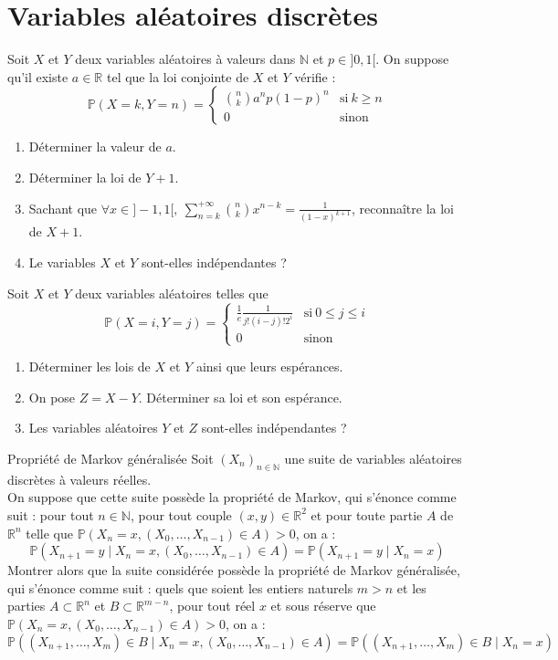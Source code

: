 \documentclass[french,a4paper]{article}
\renewcommand{\P}{\mathbb{P}}
\newcommand{\N}{\mathbb{N}}
\newcommand{\R}{\mathbb{R}}
\theoremstyle{plain}
\theoremstyle{definition}
\theoremstyle{remark}
\begin{document}
\section{Variables aléatoires discrètes}

\begin{ex}[Moulin.41]{}
	Soit $X$ et $Y$ deux variables aléatoires à valeurs dans $\N$ et $p\in]0,1[$. On suppose qu'il existe $a\in\R$ tel que la loi conjointe de $X$ et $Y$ vérifie : $$\P(X=k,Y=n)=\begin{cases}
		\displaystyle\binom{n}{k}a^np(1-p)^n&\text{si}\ k\geqslant n \\
		0&\text{sinon}
	\end{cases}$$
	\begin{enumerate}
		\item Déterminer la valeur de $a$.
		\item Déterminer la loi de $Y+1$.
		\item Sachant que $\forall x\in]-1,1[,\ \displaystyle\sum_{n=k}^{+\infty}\binom{n}{k}x^{n-k}=\frac{1}{(1-x)^{k+1}}$, reconnaître la loi de $X+1$.
		\item Le variables $X$ et $Y$ sont-elles indépendantes ?
	\end{enumerate}
\end{ex}

\begin{ex}[Moulin.42]{}
	Soit $X$ et $Y$ deux variables aléatoires telles que $$\P(X=i,Y=j)=\begin{cases}
		\displaystyle\frac{1}{e}\frac{1}{j!(i-j)!2^i}&\text{si}\ 0\leqslant j\leqslant i \\
		0&\text{sinon}
	\end{cases}$$
	\begin{enumerate}
		\item Déterminer les lois de $X$ et $Y$ ainsi que leurs espérances.
		\item On pose $Z=X-Y$. Déterminer sa loi et son espérance.
		\item Les variables aléatoires $Y$ et $Z$ sont-elles indépendantes ?
	\end{enumerate}
\end{ex}

\begin{ex}[Moulin.43]{Propriété de Markov généralisée}
	Soit $(X_n)_{n\in\N}$ une suite de variables aléatoires discrètes à valeurs réelles. \\
	On suppose que cette suite possède la propriété de Markov, qui s'énonce comme suit : pour tout $n\in\N$, pour tout couple $(x,y)\in\R^2$ et pour toute partie $A$ de $\R^n$ telle que $\P(X_n=x,(X_0,\ldots,X_{n-1})\in A)>0$, on a : $$\P(X_{n+1}=y\mid X_n=x,(X_0,\ldots,X_{n-1})\in A)=\P(X_{n+1}=y\mid X_n=x)$$
	Montrer alors que la suite considérée possède la propriété de Markov généralisée, qui s'énonce comme suit : quels que soient les entiers naturels $m>n$ et les parties $A\subset\R^n$ et $B\subset\R^{m-n}$, pour tout réel $x$ et sous réserve que $\P(X_n=x,(X_0,\ldots,X_{n-1})\in A)>0$, on a : $$\P((X_{n+1},\ldots,X_{m})\in B\mid X_n=x,(X_0,\ldots,X_{n-1})\in A)=\P((X_{n+1},\ldots,X_{m})\in B\mid X_n=x)$$
\end{ex}
\end{document}
